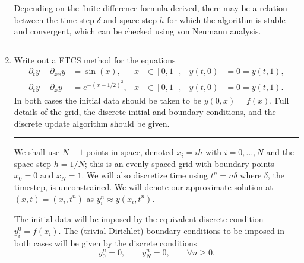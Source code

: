 \documentclass[10pt]{article}
\begin{document}
\begin{enumerate}
  Depending on the finite difference formula derived, there may be a
  relation between the time step $\delta$ and space step $h$ for which
  the algorithm is stable and convergent, which can be checked using
  von Neumann analysis.
  \begin{center}
    \rule{0.9\textwidth}{.1pt}
  \end{center}
\item Write out a FTCS method for the equations
  \begin{align*}
    \partial_t y - \partial_{xx} y & = \sin(x), & x & \in [0,1], &
    y(t, 0) & = 0 = y(t, 1), \\
    \partial_t y + \partial_{x} y & = e^{-(x-1/2)^2}, & x & \in [0,1], &
    y(t, 0) & = 0 = y(t, 1).
  \end{align*}
  In both cases the initial data should be taken to be $y(0, x) =
  f(x)$. Full details of the grid, the discrete initial and boundary
  conditions, and the discrete update algorithm should be given.
  \begin{center}
    \rule{0.9\textwidth}{.1pt}
  \end{center}
  We shall use $N+1$ points in space, denoted $x_i = i h$ with $i = 0,
  \dots, N$ and the space step $h = 1 / N$; this is an evenly spaced
  grid with boundary points $x_0 = 0$ and $x_N = 1$. We will also
  discretize time using $t^n = n \delta$ where $\delta$, the timestep,
  is unconstrained. We will denote our approximate solution at $(x, t)
  = (x_i, t^n)$ as $y_i^n \approx y(x_i, t^n)$.

  The initial data will be imposed by the equivalent discrete
  condition $y_i^0 = f(x_i)$. The (trivial Dirichlet) boundary
  conditions to be imposed in both cases will be given by the discrete
  conditions
  \begin{equation*}
    y_0^n = 0, \qquad y_N^n = 0, \qquad \forall n \ge 0.
  \end{equation*}


\end{enumerate}
\end{document}
